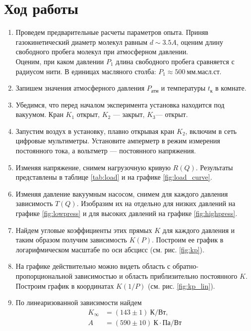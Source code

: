 \documentclass[12pt]{article}
\begin{document}
    \section{Ход работы}
        \begin{enumerate}
            \item Проведем предварительные расчеты параметров опыта. Приняв газокинетический диаметр молекул равным $d \sim 3.5 A$, оценим
            длину свободного пробега молекул при атмосферном давлении.\\
            Оценим, при каком давлении $P_1$ длина свободного пробега сравняется с радиусом нити. В единицах масляного столба: $P_1 \approx 500\ \text{мм.масл.ст.}$
            \item Запишем значения атмосферного давления $P_{\text{атм}}$ и температуры $t_{\text{к}}$ в комнате.
            \item Убедимся, что перед началом эксперимента установка находится под вакуумом. Кран $K_1$ открыт, $K_2$ — закрыт, $K_3$— открыт.
            \item Запустим воздух в установку, плавно открывая кран $K_2$, включим в сеть цифровые мультиметры. Установите амперметр в режим
            измерения постоянного тока, а вольтметр — постоянного напряжения.
            \item Изменяя напряжение, снимем нагрузочную кривую $R(Q)$. Результаты представлены в
            таблице \ref{tab:load} и на графике \ref{fig:load_curve}.

            \item Изменяя давление вакуумным насосом, снимем для каждого давления
            зависимость $T(Q)$. Изобразим их на отдельно для низких давлений на графике \ref{fig:lowpress}
            и для высоких давлений на графике \ref{fig:highpress}.

            \item Найдем угловые коэффициенты этих прямых $K$ для каждого давления
            и таким образом получим зависимость $K(P)$. Построим ее график в логарифмическом масштабе
            по оси абсцисс (см. рис. \ref{fig:kp}).

            \item На графике действительно можно видеть область с обратно-пропорциональной зависимостью и
            область приблизительно постоянного $K$. Построим график в координатах $K(1/P)$ (см. рис. \ref{fig:kp_lin}).

            \item По линеаризованной зависимости найдем
            \begin{align*}
            K_{\infty} & = (143\pm 1)\ \text{К}/\text{Вт},\\
            A & = (590\pm 10)\ \text{К}\cdot \text{Па}/\text{Вт}
            \end{align*}


\end{enumerate}
\end{document}
